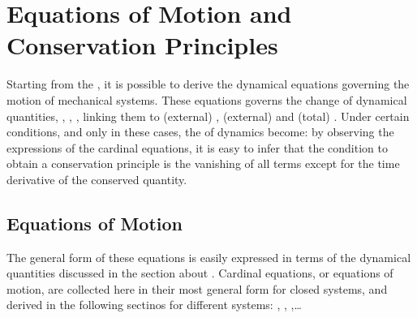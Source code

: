 \documentclass[letterpaper,10pt,english]{jupyterBook}
\begin{document}
\sphinxstepscope


\section{Equations of Motion and Conservation Principles}
\label{\detokenize{ch/dynamics-eom:equations-of-motion-and-conservation-principles}}\label{\detokenize{ch/dynamics-eom:classical-mechanics-dynamics-eom}}\label{\detokenize{ch/dynamics-eom::doc}}
\sphinxAtStartPar
Starting from the {\hyperref[\detokenize{ch/dynamics-principles:classical-mechanics-dynamics-principles}]{}}, it is possible to derive the dynamical equations governing the motion of mechanical systems. These equations governs the change of dynamical quantities, , , , linking them to (external) , (external)  and (total) . Under certain conditions, and only in these cases, the {\hyperref[\detokenize{ch/dynamics-eom:classical-mechanics-dynamics-eom-eom}]{}} of dynamics become{\hyperref[\detokenize{ch/dynamics-eom:classical-mechanics-dynamics-eom-conservation}]{}}: by observing the expressions of the cardinal equations, it is easy to infer that the condition to obtain a conservation principle is the vanishing of all terms except for the time derivative of the conserved quantity.




\subsection{Equations of Motion}
\label{\detokenize{ch/dynamics-eom:equations-of-motion}}\label{\detokenize{ch/dynamics-eom:classical-mechanics-dynamics-eom-eom}}
\sphinxAtStartPar
The general form of these equations is easily expressed in terms of the dynamical quantities discussed in the section about . Cardinal equations, or equations of motion, are collected here in their most general form for closed systems, and derived in the following sectinos for different systems: {\hyperref[\detokenize{ch/dynamics-eom-point:classical-mechanics-dynamics-eom-point}]{}}, {\hyperref[\detokenize{ch/dynamics-eom-points:classical-mechanics-dynamics-eom-points}]{}}, {\hyperref[\detokenize{ch/dynamics-eom-rigid:classical-mechanics-dynamics-eom-rigid}]{}},…
\end{document}
